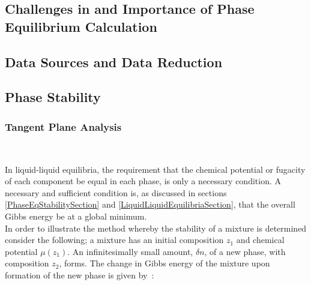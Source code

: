 \subsection{Challenges in and Importance of Phase Equilibrium Calculation}

\subsection{Data Sources and Data Reduction}



\subsection{Phase Stability}\label{PhaseStabilityComputationalSection}

\subsubsection{Tangent Plane Analysis}\ 
	
In liquid-liquid equilibria, the requirement that the chemical potential or fugacity of each component be equal in each phase, is only a necessary condition. A necessary and sufficient condition is, as discussed in sections \ref{PhaseEqStabilitySection} and \ref{LiquidLiquidEquilibriaSection}, that the overall Gibbs energy be at a global minimum.\\

In order to illustrate the method whereby the stability of a mixture is determined consider the following; a mixture has an initial composition $z_{1}$  and chemical potential $\mu\left(z_{1}\right)$. An infinitesimally small amount, $\delta n$, of a new phase, with composition $z_{2}$,  forms. The change in Gibbs energy of the mixture upon formation of the new phase is given by~\cite{ThermodynamicModels}:\

